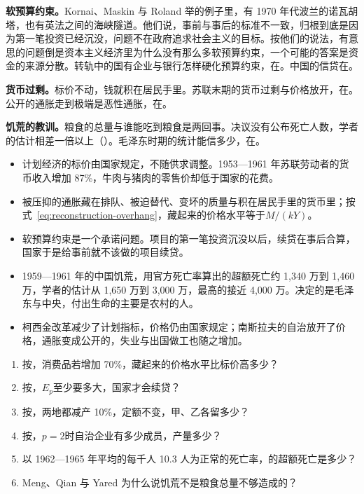 \textbf{软预算约束。}Kornai、Maskin 与 Roland 举的例子里，有 1970 年代波兰的诺瓦胡塔，也有英法之间的海峡隧道\cite{kmr2003}。他们说，事前与事后的标准不一致，归根到底是因为第一笔投资已经沉没，问题不在政府追求社会主义的目标\cite{kmr2003}。按他们的说法，有意思的问题倒是资本主义经济里为什么没有那么多软预算约束，一个可能的答案是资金的来源分散\cite{kmr2003}。转轨中的国有企业与银行怎样硬化预算约束，在。中国的信贷在。

\textbf{货币过剩。}标价不动，钱就积在居民手里。苏联末期的货币过剩与价格放开，在。公开的通胀走到极端是恶性通胀，在。

\textbf{饥荒的教训。}粮食的总量与谁能吃到粮食是两回事。决议没有公布死亡人数，学者的估计相差一倍以上（）。毛泽东时期的统计能信多少，在。

\begin{takeaways}
\begin{itemize}
\item 计划经济的标价由国家规定，不随供求调整。1953—1961 年苏联劳动者的货币收入增加 87\%，牛肉与猪肉的零售价却低于国家的花费。
\item 被压抑的通胀藏在排队、被迫替代、变坏的质量与积在居民手里的货币里；按式~\eqref{eq:reconstruction-overhang}，藏起来的价格水平等于$M/(kY)$。
\item 软预算约束是一个承诺问题。项目的第一笔投资沉没以后，续贷在事后合算，国家于是给事前就不该做的项目续贷。
\item 1959—1961 年的中国饥荒，用官方死亡率算出的超额死亡约 1,340 万到 1,460 万，学者的估计从 1,650 万到 3,000 万，最高的接近 4,000 万。决定的是毛泽东与中央，付出生命的主要是农村的人。
\item 柯西金改革减少了计划指标，价格仍由国家规定；南斯拉夫的自治放开了价格，通胀变成公开的，失业与出国做工也随之增加。
\end{itemize}
\end{takeaways}

\begin{selfcheck}
\begin{enumerate}
\item 按，消费品若增加 70\%，藏起来的价格水平比标价高多少？
\item 按，$E_p$至少要多大，国家才会续贷？
\item 按，两地都减产 10\%，定额不变，甲、乙各留多少？
\item 按，$p=2$时自治企业有多少成员，产量多少？
\item 以 1962—1965 年平均的每千人 10.3 人为正常的死亡率，的超额死亡是多少？
\item Meng、Qian 与 Yared 为什么说饥荒不是粮食总量不够造成的？
\end{enumerate}
\end{selfcheck}


